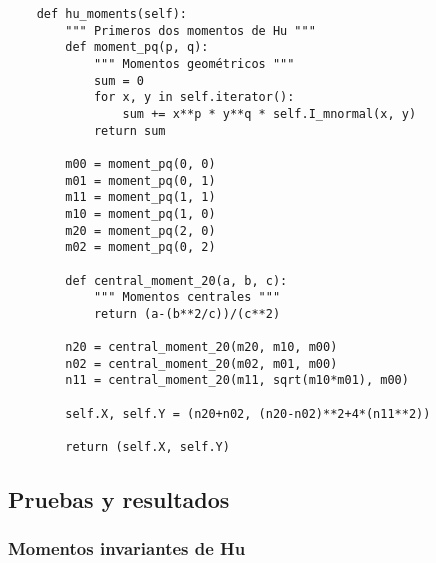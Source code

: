 \documentclass[letter]{article}
\begin{document}
\begin{verbatim}
    def hu_moments(self):
        """ Primeros dos momentos de Hu """
        def moment_pq(p, q):
            """ Momentos geométricos """
            sum = 0
            for x, y in self.iterator():
                sum += x**p * y**q * self.I_mnormal(x, y)
            return sum

        m00 = moment_pq(0, 0)
        m01 = moment_pq(0, 1)
        m11 = moment_pq(1, 1)
        m10 = moment_pq(1, 0)
        m20 = moment_pq(2, 0)
        m02 = moment_pq(0, 2)

        def central_moment_20(a, b, c):
            """ Momentos centrales """
            return (a-(b**2/c))/(c**2)

        n20 = central_moment_20(m20, m10, m00)
        n02 = central_moment_20(m02, m01, m00)
        n11 = central_moment_20(m11, sqrt(m10*m01), m00)

        self.X, self.Y = (n20+n02, (n20-n02)**2+4*(n11**2))

        return (self.X, self.Y)
\end{verbatim}
\subsection{Pruebas y resultados}
\label{sec:org41ea863}
\subsubsection{Momentos invariantes de Hu}
\label{sec:orgdb4bdd9}
\end{document}
